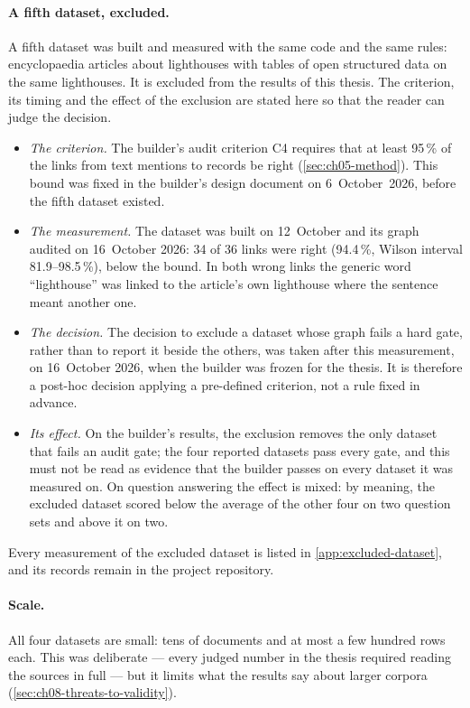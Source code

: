 \paragraph{A fifth dataset, excluded.} A fifth dataset was built and measured with the same code and the same
rules: encyclopaedia articles about lighthouses with tables of open structured data on the same lighthouses. It
is excluded from the results of this thesis. The criterion, its timing and the effect of the exclusion are
stated here so that the reader can judge the decision.
\begin{itemize}[nosep]
\item \emph{The criterion.} The builder's audit criterion C4 requires that at least 95\,\% of the links from
text mentions to records be right (\cref{sec:ch05-method}). This bound was fixed in the builder's design
document on 6~October~2026, before the fifth dataset existed.
\item \emph{The measurement.} The dataset was built on 12~October and its graph audited on 16~October 2026:
34 of 36 links were right (94.4\,\%, Wilson interval 81.9--98.5\,\%), below the bound. In both wrong links the
generic word ``lighthouse'' was linked to the article's own lighthouse where the sentence meant another one.
\item \emph{The decision.} The decision to exclude a dataset whose graph fails a hard gate, rather than to
report it beside the others, was taken after this measurement, on 16~October 2026, when the builder was frozen
for the thesis. It is therefore a post-hoc decision applying a pre-defined criterion, not a rule fixed in
advance.
\item \emph{Its effect.} On the builder's results, the exclusion removes the only dataset that fails an audit
gate; the four reported datasets pass every gate, and this must not be read as evidence that the builder passes
on every dataset it was measured on. On question answering the effect is mixed: by meaning, the excluded
dataset scored below the average of the other four on two question sets and above it on two.
\end{itemize}
Every measurement of the excluded dataset is listed in \cref{app:excluded-dataset}, and its records remain in
the project repository.

\paragraph{Scale.} All four datasets are small: tens of documents and at most a few hundred rows each. This
was deliberate --- every judged number in the thesis required reading the sources in full --- but it limits
what the results say about larger corpora (\cref{sec:ch08-threats-to-validity}).


